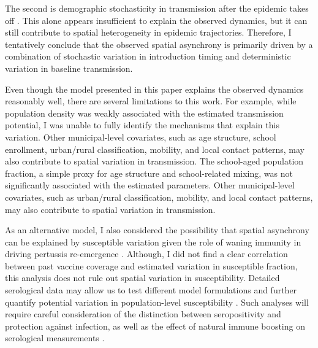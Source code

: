 \documentclass[12pt]{article}
\begin{document}
The second is demographic stochasticity in transmission after the epidemic takes off \citep{finkenstadt2002stochastic,lloyd2005superspreading,magpantay2016pertussis}. 
This alone appears insufficient to explain the observed dynamics, but it can still contribute to spatial heterogeneity in epidemic trajectories. 
Therefore, I tentatively conclude that the observed spatial asynchrony is primarily driven by a combination of stochastic variation in introduction timing and deterministic variation in baseline transmission.

Even though the model presented in this paper explains the observed dynamics reasonably well, there are several limitations to this work.
For example, while population density was weakly associated with the estimated transmission potential, I was unable to fully identify the mechanisms that explain this variation.
Other municipal-level covariates, such as age structure, school enrollment, urban/rural classification, mobility, and local contact patterns, may also contribute to spatial variation in transmission.
The school-aged population fraction, a simple proxy for age structure and school-related mixing, was not significantly associated with the estimated parameters.
Other municipal-level covariates, such as urban/rural classification, mobility, and local contact patterns, may also contribute to spatial variation in transmission.

As an alternative model, I also considered the possibility that spatial asynchrony can be explained by susceptible variation given the role of waning immunity in driving pertussis re-emergence \citep{wearing2009estimating,tan2015pertussis,domenech2018impact}.
Although, I did not find a clear correlation between past vaccine coverage and estimated variation in susceptible fraction, this analysis does not rule out spatial variation in susceptibility.
Detailed serological data may allow us to test different model formulations and further quantify potential variation in population-level susceptibility \citep{mina2020global,nguyen2022enterovirus,nguyen2026dynamics}.
Such analyses will require careful consideration of the distinction between seropositivity and protection against infection, as well as the effect of natural immune boosting on serological measurements \citep{domenech2025natural}.
\end{document}

